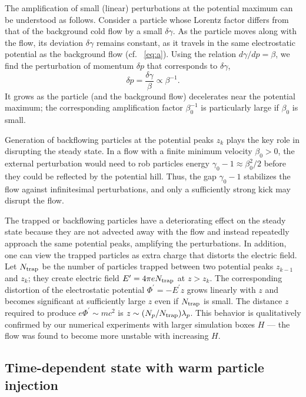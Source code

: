 The amplification of small (linear) perturbations at the potential maximum can be
understood as follows.
Consider a particle whose Lorentz factor differs from that of the background cold
flow by a small $\delta\gamma$. As the particle moves along with the flow, its deviation
$\delta\gamma$ remains constant, as it travels in the same electrostatic potential as
the background flow (cf. \Eq~\ref{eq:a}). Using the relation $d\gamma/dp=\beta$, we
find the perturbation of momentum $\delta p$ that corresponds to $\delta\gamma$,
\begin{equation}
    \delta p = \frac{\delta\gamma}{\beta}\propto \beta^{-1}.
\end{equation}
It grows as the particle (and the background flow) decelerates near the potential maximum;
the corresponding amplification factor $\beta_0^{-1}$ is particularly large if
$\beta_0$ is small.

Generation of backflowing particles at the potential peaks $z_k$ plays the key role in
disrupting the steady state. In a flow with a finite minimum velocity
$\beta_0>0$, the external perturbation would need to rob particles
energy $\gamma_0-1\approx \beta_0^2/2$ before they could be reflected by the
potential hill. Thus, the gap $\gamma_0-1$ stabilizes the flow against infinitesimal
perturbations, and only a sufficiently strong kick may disrupt the flow.

The trapped or backflowing particles have a deteriorating effect on the steady state
because they are not advected away with the flow and instead repeatedly approach
the same potential peaks, amplifying the perturbations. In addition, one can view
the trapped particles as extra
charge that distorts the electric field. Let $N_{\rm trap}$ be the number of particles
trapped between two potential peaks $z_{k-1}$ and $z_k$; they create electric field
$E^\prime=4\pi eN_{\rm trap}$ at $z>z_k$. The corresponding distortion of the
electrostatic potential $\Phi^\prime=-E^\prime z$ grows linearly with $z$ and
becomes significant at sufficiently large $z$ even if $N_{\rm trap}$ is small.
The distance $z$ required to produce
$e\Phi^\prime \sim mc^2$ is $z\sim (N_p/N_{\rm trap})\lambda_p$.
This behavior is qualitatively confirmed by our numerical experiments with
larger simulation boxes $H$ --- the flow
was found to become more unstable with increasing $H$.


\subsection{Time-dependent state with warm particle injection}\label{sec:warm}


